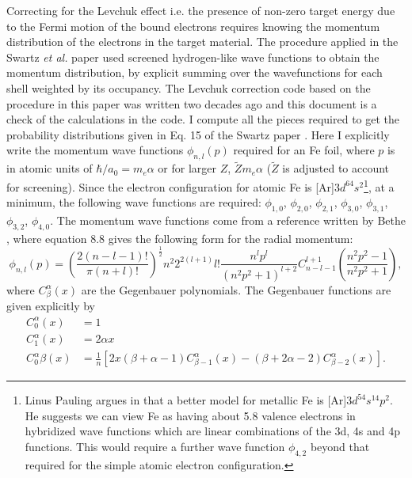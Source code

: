 \documentclass[12pt]{article}
\begin{document}
\maketitle
Correcting for the Levchuk effect i.e. the presence of non-zero target energy due to the Fermi motion of the bound electrons requires knowing the momentum distribution of the electrons in the target material. The procedure applied in the Swartz {\it et al.} paper \cite{Swartz1995} used screened hydrogen-like wave functions to obtain the momentum distribution, by explicit summing over the wavefunctions for each shell weighted by its occupancy. The Levchuk correction code based on the procedure in this paper was written two decades ago and this document is a check of the calculations in the code. I compute all the pieces required to get the probability distributions given in Eq. 15 of the Swartz paper \cite{Swartz1995}. Here I explicitly write the momentum wave functions $\phi_{n,l}(p)$ required for an Fe foil, where $p$ is in atomic units of $\hbar/a_0=m_e\alpha$ or for larger $Z$, $\tilde Z m_e\alpha$ ($\tilde Z$ is adjusted to account for screening). Since the electron configuration for atomic Fe is [Ar]$3d^64s^2$\footnote{Linus Pauling argues in \cite{Pauling1953} that a better model for metallic Fe is [Ar]$3d^54s^14p^2$. He suggests we can view Fe as having about 5.8 valence electrons in hybridized wave functions which are linear combinations of the 3d, 4s and 4p functions. This would require a further wave function $\phi_{4,2}$ beyond that required for the simple atomic electron configuration.}, at a minimum, the following wave functions are required: $\phi_{1,0}$, $\phi_{2,0}$, $\phi_{2,1}$, $\phi_{3,0}$, $\phi_{3,1}$, $\phi_{3,2}$, $\phi_{4,0}$. The momentum wave functions come from a reference written by Bethe \cite{Bethe1957}, where equation 8.8 gives the following form for the radial momentum:
\begin{equation}
\phi_{n,l}(p)=\left(\frac{2(n-l-1)!}{\pi(n+l)!}\right)^{\frac{1}{2}}n^2 2^{2(l+1)}l!\frac{n^lp^l}{(n^2p^2+1)^{l+2}}C^{l+1}_{n-l-1}\left(\frac{n^2p^2-1}{n^2p^2+1}\right),
\label{eq:phi_nl}
\end{equation}
where $C_\beta^\alpha(x)$ are the Gegenbauer polynomials. The Gegenbauer functions are given explicitly by
\begin{align*}
C^\alpha_0(x)&=1\\
C^\alpha_1(x)&=2\alpha x\\
C^\alpha_0\beta(x)&=\frac{1}{n}\left[2x(\beta+\alpha-1)C^\alpha_{\beta-1}(x)-(\beta+2\alpha-2)C^\alpha_{\beta-2}(x)\right].
\end{align*}
\end{document}
